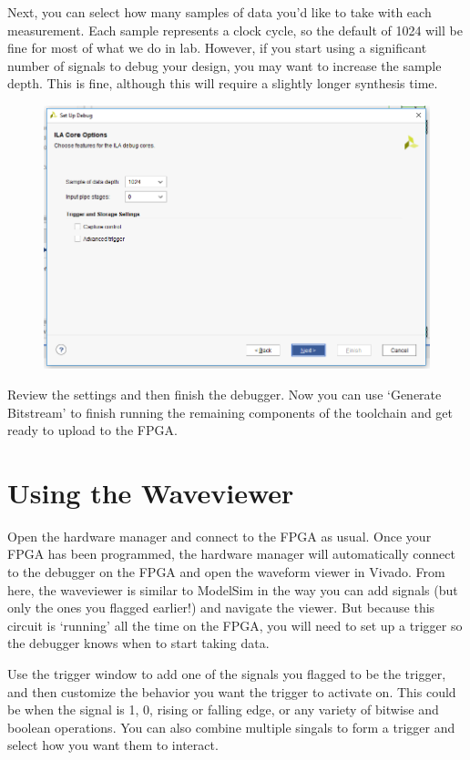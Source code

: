 \documentclass{article}
\begin{document}
Next, you can select how many samples of data you'd like to take with
each measurement.  Each sample represents a clock cycle, so the
default of 1024 will be fine for most of what we do in lab. However,
if you start using a significant number of signals to debug your
design, you may want to increase the sample depth. This is fine,
although this will require a slightly longer synthesis time.
\begin{figure} [h!]
  \centering
  \includegraphics[scale=0.35]{figures/figure3.png}
\end{figure}	
	
Review the settings and then finish the debugger.  Now you can use
`Generate Bitstream' to finish running the remaining components of the
toolchain and get ready to upload to the FPGA. 	
	
\section{Using the Waveviewer}
Open the hardware manager and connect to the FPGA as usual.  Once your
FPGA has been programmed, the hardware manager will automatically
connect to the debugger on the FPGA and open the waveform viewer in
Vivado.  From here, the waveviewer is similar to ModelSim in the way
you can add signals (but only the ones you flagged earlier!) and
navigate the viewer.  But because this circuit is `running' all the
time on the FPGA, you will need to set up a trigger so the debugger
knows when to start taking data.
	
Use the trigger window to add one of the signals you flagged to be the
trigger, and then customize the behavior you want the trigger to
activate on.  This could be when the signal is 1, 0, rising or falling
edge, or any variety of bitwise and boolean operations.  You can also
combine multiple singals to form a trigger and select how you want
them to interact.
	
\end{document}
